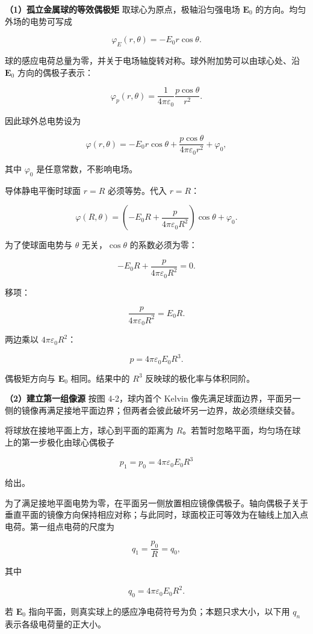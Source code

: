 \documentclass[12pt,a4paper,UTF8]{ctexart}
\begin{document}
\textbf{（1）孤立金属球的等效偶极矩} 取球心为原点，极轴沿匀强电场
\(\bm E_0\) 的方向。均匀外场的电势可写成

\[\varphi_E(r,\theta)=-E_0r\cos\theta.\]

球的感应电荷总量为零，并关于电场轴旋转对称。球外附加势可以由球心处、沿
\(\bm E_0\) 方向的偶极子表示：

\[\varphi_p(r,\theta)
=\frac{1}{4\pi\varepsilon_0}
\frac{p\cos\theta}{r^2}.\]

因此球外总电势设为

\[\varphi(r,\theta)
=-E_0r\cos\theta
+\frac{p\cos\theta}{4\pi\varepsilon_0r^2}
+\varphi_0,\]

其中 \(\varphi_0\) 是任意常数，不影响电场。

导体静电平衡时球面 \(r=R\) 必须等势。代入 \(r=R\)：

\[\varphi(R,\theta)
=\left(
-E_0R
+\frac{p}{4\pi\varepsilon_0R^2}
\right)\cos\theta+\varphi_0.\]

为了使球面电势与 \(\theta\) 无关，\(\cos\theta\) 的系数必须为零：

\[-E_0R+\frac{p}{4\pi\varepsilon_0R^2}=0.\]

移项：

\[\frac{p}{4\pi\varepsilon_0R^2}=E_0R.\]

两边乘以 \(4\pi\varepsilon_0R^2\)：

\[\boxed{p=4\pi\varepsilon_0E_0R^3}.\]

偶极矩方向与 \(\bm E_0\) 相同。结果中的 \(R^3\)
反映球的极化率与体积同阶。

\textbf{（2）建立第一组像源} 按图 4-2，球内首个 Kelvin
像先满足球面边界，平面另一侧的镜像再满足接地平面边界；但两者会彼此破坏另一边界，故必须继续交替。

将球放在接地平面上方，球心到平面的距离为
\(R\)。若暂时忽略平面，均匀场在球上的第一步极化由球心偶极子

\[p_1=p_0=4\pi\varepsilon_0E_0R^3\]

给出。

为了满足接地平面电势为零，在平面另一侧放置相应镜像偶极子。轴向偶极子关于垂直平面的镜像方向保持相应对称；与此同时，球面校正可等效为在轴线上加入点电荷。第一组点电荷的尺度为

\[q_1=\frac{p_0}{R}=q_0,\]

其中

\[q_0=4\pi\varepsilon_0E_0R^2.\]

若 \(\bm E_0\)
指向平面，则真实球上的感应净电荷符号为负；本题只求大小，以下用 \(q_n\)
表示各级电荷量的正大小。
\end{document}
